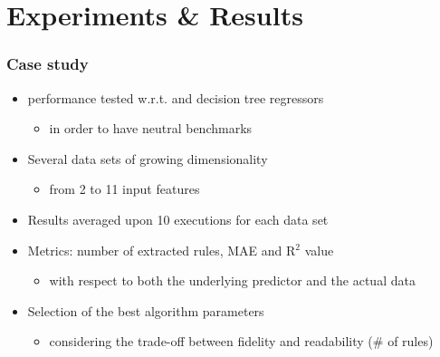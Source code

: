 \documentclass[presentation]{beamer}
\begin{document}
\section{Experiments \& Results}

\begin{frame}%
\frametitle{Case study}

    \begin{itemize}
    	\item \gridex performance tested w.r.t. \iter and decision tree regressors
    	\begin{itemize}
    		\item in order to have neutral benchmarks
    	\end{itemize}
    
    	\vfill
    	
    	\item Several data sets of growing dimensionality
    	 \begin{itemize}
    		\item from 2 to 11 input features
    	\end{itemize}
    
    	\vfill
    	
    	\item Results averaged upon 10 executions for each data set
    	
    	\vfill
    	
    	\item Metrics: number of extracted rules, MAE and R$^2$ value
    	\begin{itemize}
    		\item with respect to both the underlying predictor and the actual data
    	\end{itemize}
    	
    	\vfill
    	
    	\item Selection of the best algorithm parameters
    	\begin{itemize}
    		\item considering the trade-off between fidelity and readability (\# of rules)
    	\end{itemize}
    	
    	\vfill
    \end{itemize}

\end{frame}
\end{document}

